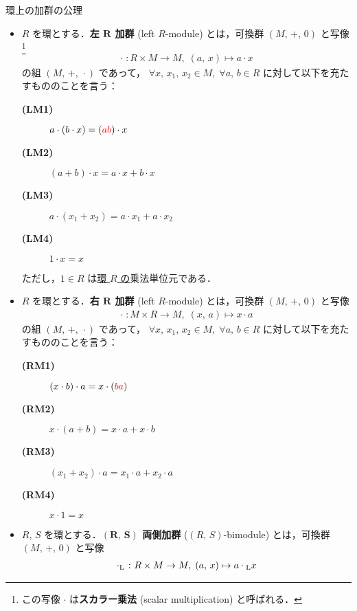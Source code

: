 \documentclass[rep_main]{subfiles}
\begin{document}
\begin{myaxiom}[label=ax:R-module,breakable]{環上の加群の公理}
	\begin{itemize}
		\item $R$ を環とする．\textbf{左 $\bm{R}$ 加群} (left $R$-module) とは，可換群 $(M,\, +,\, 0)$ と写像\footnote{この写像 $\cdot$ は\textbf{スカラー乗法} (scalar multiplication) と呼ばれる．}
		\begin{align}
			\cdot \; \colon R \times M \to M,\; (a,\, x) \mapsto a \cdot x
		\end{align}
		の組 $(M,\, +,\,\cdot\mathrel{})$ であって， $\forall x,\, x_1,\, x_2 \in M,\; \forall a,\, b \in R$ に対して以下を充たすもののことを言う：
		\begin{description}
			\item[\textbf{(LM1)}] $a \cdot (b \cdot x) = (\textcolor{red}{ab}) \cdot x$
			\item[\textbf{(LM2)}] $(a+b) \cdot x = a \cdot x + b \cdot x$
			\item[\textbf{(LM3)}] $a \cdot (x_1 + x_2) = a \cdot x_1 + a\cdot x_2$
			\item[\textbf{(LM4)}] $1 \cdot x = x$
		\end{description}
		ただし，$1 \in R$ は\underline{環 $R$ の}乗法単位元である．
		\item $R$ を環とする．\textbf{右 $\bm{R}$ 加群} (left $R$-module) とは，可換群 $(M,\, +,\, 0)$ と写像
		\begin{align}
			\cdot \; \colon M \times R \to M,\; (x,\, a) \mapsto x \cdot a
		\end{align}
		の組 $(M,\, +,\,\cdot\mathrel{})$ であって， $\forall x,\, x_1,\, x_2 \in M,\; \forall a,\, b \in R$ に対して以下を充たすもののことを言う：
		\begin{description}
			\item[\textbf{(RM1)}] $(x \cdot b) \cdot a = x \cdot (\textcolor{red}{ba})$
			\item[\textbf{(RM2)}] $x \cdot (a+b) = x \cdot a + x \cdot b$
			\item[\textbf{(RM3)}] $(x_1 + x_2) \cdot a = x_1 \cdot a + x_2 \cdot a$
			\item[\textbf{(RM4)}] $x \cdot 1 = x$
		\end{description}
		\item $R,\, S$ を環とする．\textbf{$\bm{(R,\, S)}$ 両側加群} ($(R,\, S)$-bimodule) とは，可換群 $(M,\, +,\, 0)$ と写像
		\begin{align}
			\irm{\cdot}{L} \mathrel{} &\colon R \times M \to M,\; (a,\, x) \mapsto a \irm{\cdot}{L} x \\

\end{align}
\end{itemize}
\end{myaxiom}
\end{document}
